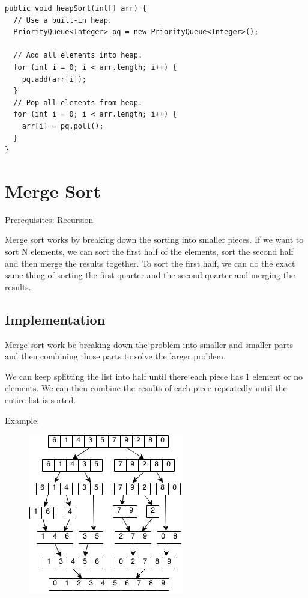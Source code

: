 \documentclass[11pt,oneside]{book}
\makeatletter
\def\maxwidth#1{\ifdim\Gin@nat@width>#1 #1\else\Gin@nat@width\fi}
\makeatother
\begin{document}
\begin{lstlisting}
public void heapSort(int[] arr) {
  // Use a built-in heap.
  PriorityQueue<Integer> pq = new PriorityQueue<Integer>();

  // Add all elements into heap.
  for (int i = 0; i < arr.length; i++) {
    pq.add(arr[i]);
  }
  // Pop all elements from heap.
  for (int i = 0; i < arr.length; i++) {
    arr[i] = pq.poll();
  }
}
\end{lstlisting}

        \section{ Merge Sort }
        

Prerequisites: Recursion

Merge sort works by breaking down the sorting into smaller pieces. If we want to sort N elements, we can sort the first half of the elements, sort the second half and then merge the results together. To sort the first half, we can do the exact same thing of sorting the first quarter and the second quarter and merging the results.

\subsection{Implementation}

Merge sort work be breaking down the problem into smaller and smaller parts and then combining those parts to solve the larger problem.

We can keep splitting the list into half until there each piece has 1 element or no elements. We can then combine the results of each piece repeatedly until the entire list is sorted.

Example:

\vspace{5px}\begin{figure}[H]\centering
        \includegraphics[width=0.66\maxwidth{\textwidth}]{mergesort.png}
        \end{figure}
\end{document}
